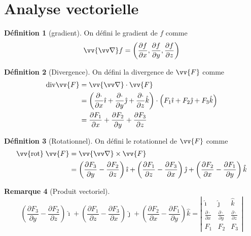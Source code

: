 \documentclass[11pt,a4paper]{article}
\theoremstyle{definition}
\newtheorem{mydef}{Définition}[section]
\newtheorem{myrem}[mydef]{Remarque}
\newcommand{\kmath}{k}
\renewcommand{\div}{\mathrm{div}}
\newcommand{\rot}{\vv{\mathrm{rot}}\;}
\let\oldnabla\nabla
\renewcommand{\nabla}{\vv{\oldnabla}}
\newcommand{\pa}{\partial}
\begin{document}
\section{Analyse vectorielle}

\begin{mydef}[gradient] On défini le gradient de $f$ comme
\[ \nabla f = \left( \frac{\pa f}{\pa x} , \frac{\pa f}{\pa y} , \frac{\pa f}{\pa z} \right) \]
\end{mydef}

\begin{mydef}[Divergence] On défini la divergence de $\vv{F}$ comme
\begin{align*} \div \vv{F} & = \nabla \cdot \vv{F} \\
											& = \left( \frac{\pa \cdot}{\pa x} \hat{\imath} + \frac{\pa \cdot}{\pa y} \hat{\jmath} + \frac{\pa \cdot}{\pa z} \hat{\kmath} \right) \cdot \left( F_1 \hat{\imath} + F_2 \hat{\jmath} + F_3 \hat{\kmath} \right) \\
											& = \frac{\pa F_1}{\pa x} + \frac{\pa F_2}{\pa y} + \frac{\pa F_3}{\pa z} \\
											\end{align*}
\end{mydef}

\begin{mydef}[Rotationnel] On défini le rotationnel de $\vv{F}$ comme
\begin{align*} \rot \vv{F} & = \nabla \times \vv{F} \\
														& = \left( \frac{\pa F_3}{\pa y} -  \frac{\pa F_2}{\pa z} \right) \hat{\imath} + \left( \frac{\pa F_1}{\pa z} -  \frac{\pa F_3}{\pa x} \right) \hat{\jmath} + \left( \frac{\pa F_2}{\pa x} -  \frac{\pa F_1}{\pa y} \right) \hat{\kmath} \end{align*}
\end{mydef}

\begin{myrem}[Produit vectoriel]
\[ \left( \frac{\pa F_3}{\pa y} -  \frac{\pa F_2}{\pa z} \right) \hat{\imath} + \left( \frac{\pa F_1}{\pa z} -  \frac{\pa F_3}{\pa x} \right) \hat{\jmath} + \left( \frac{\pa F_2}{\pa x} -  \frac{\pa F_1}{\pa y} \right) \hat{\kmath} =
\left| \begin{array}{ccc} \hat{\imath} & \hat{\jmath} & \hat{\kmath} \\ \frac{\pa \cdot}{\pa x} & \frac{\pa \cdot}{\pa y} & \frac{\pa \cdot}{\pa z} \\ F_1 & F_2 & F_3 \end{array}  \right| \]
\end{myrem}
\end{document}
